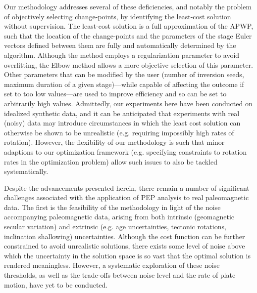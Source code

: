\documentclass{article} %
\begin{document}
Our methodology addresses several of these deficiencies, and notably the problem of objectively selecting change-points, by identifying the least-cost solution without supervision. The least-cost solution is a full approximation of the APWP, such that the location of the change-points and the parameters of the stage Euler vectors defined between them are fully and automatically determined by the algorithm. Although the method employs a regularization parameter to avoid overfitting, the Elbow method allows a more  objective selection of this parameter. Other parameters that can be modified by the user (number of inversion seeds, maximum duration of a given stage)---while capable of affecting the outcome if set to too low values---are used to improve efficiency and so can be set to arbitrarily high values. Admittedly, our experiments here have been conducted on idealized synthetic data, and it can be anticipated that experiments with real (noisy) data may introduce circumstances in which the least cost solution can otherwise be shown to be unrealistic (e.g. requiring impossibly high rates of rotation). However, the flexibility of our methodology is such that minor adaptions to our optimization framework (e.g. specifying constraints to rotation rates in the optimization problem) allow such issues to also be tackled systematically.

Despite the advancements presented herein, there remain a number of significant challenges associated with the application of PEP analysis to real paleomagnetic data. The first is the feasibility of the methodology in light of the noise accompanying paleomagnetic data, arising from both intrinsic (geomagnetic secular variation) and extrinsic (e.g. age uncertainties, tectonic rotations, inclination shallowing) uncertainties. Although the cost function can be further constrained to avoid unrealistic solutions, there exists some level of noise above which the uncertainty in the solution space is so vast that the optimal solution is rendered meaningless. However, a systematic exploration of these noise thresholds, as well as the trade-offs between noise level and the rate of plate motion, have yet to be conducted. 
\end{document}
